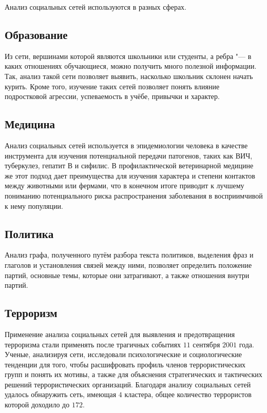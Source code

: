 Анализ социальных сетей используются в разных сферах.
\subsection{Образование}
Из сети, вершинами которой являются школьники или студенты, а ребра "--- в каких отношениях обучающиеся, можно получить много полезной информации. Так, анализ такой сети позволяет выявить, насколько школьник склонен начать курить\cite{mercken2012longitudinal}. Кроме того, изучение таких сетей позволяет понять влияние подростковой агрессии\cite{sijtsema2010forms}, успеваемость в учёбе, привычки и характер.

\subsection{Медицина}
Анализ социальных сетей используется в эпидемиологии человека в качестве инструмента для изучения потенциальной передачи патогенов, таких как ВИЧ, туберкулез, гепатит В и сифилис. В профилактической ветеринарной медицине же этот подход дает преимущества для изучения характера и степени контактов между животными или фермами, что в конечном итоге приводит к
лучшему пониманию потенциального риска распространения заболевания в восприимчивой к нему
популяции\cite{martinez2009social}.


\subsection{Политика}
Анализ графа, полученного путём разбора текста политиков, выделения фраз и глаголов и установления связей между ними, позволяет определить положение партий, основные темы, которые они затрагивают, а также отношения внутри партий\cite{politics}. 

\subsection{Терроризм}
Применение анализа социальных сетей для выявления и предотвращения терроризма стали применять после трагичных событиях $11$ сентября $2001$ года. Ученые, анализируя сети, исследовали психологические и социологические тенденции для того, чтобы расшифровать профиль членов террористических групп и понять их мотивы, а также для объяснения стратегических и тактических решений террористических организаций\cite{perliger2011social}.
Благодаря анализу социальных сетей удалось обнаружить сеть, имеющая $4$ кластера, общее количество террористов которой доходило до $172$\cite{sageman2004understanding}.

